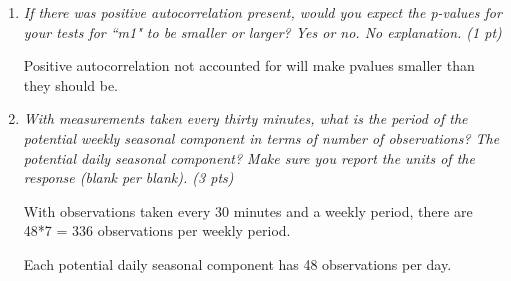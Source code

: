 \documentclass[11pt]{article}\usepackage[]{graphicx}\usepackage[]{color}
\begin{document}
\begin{enumerate}
\begin{enumerate}
\newpage

\item%
{\it If there was positive autocorrelation present, would you expect the p-values for your tests for ``m1" to be smaller or larger? Yes or no. No explanation. (1 pt)}

Positive autocorrelation not accounted for will make pvalues smaller than they should be.

\item %
{\it With measurements taken every thirty minutes, what is the period of the potential weekly seasonal component in terms of number of observations? The potential daily seasonal component? Make sure you report the units of the response (blank per blank). (3 pts) }

With observations taken every 30 minutes and a weekly period, there are 48*7 = 336 observations per weekly period.

Each potential daily seasonal component has 48 observations per day.


\end{enumerate}
\end{enumerate}
\end{document}
